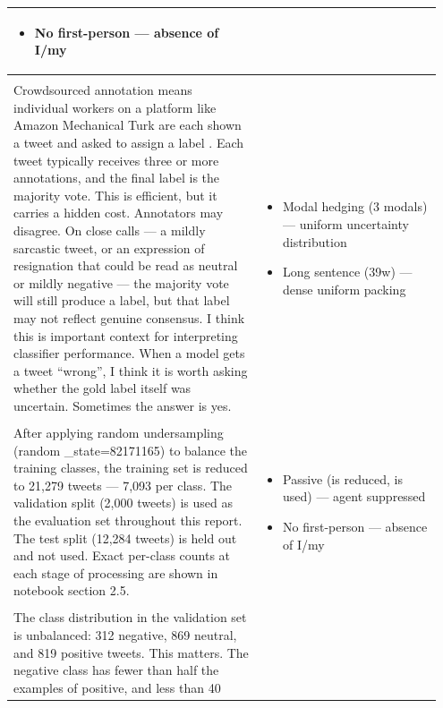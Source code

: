 \documentclass[11pt]{article}
\begin{document}
\begin{longtable}{|p{0.55\linewidth}|p{0.40\linewidth}|}
\begin{itemize}[leftmargin=1em,itemsep=1pt,topsep=1pt,parsep=0pt]
  \item No first-person --- absence of I/my
\end{itemize} \\[2pt]
\hline
\rule[-3.5cm]{0pt}{3.5cm} & \\
\hline
Crowdsourced annotation means individual workers on a platform like Amazon Mechanical Turk are each shown a tweet and asked to assign a label . Each tweet typically receives three or more annotations, and the final label is the majority vote. This is efficient, but it carries a hidden cost. Annotators may disagree. On close calls --- a mildly sarcastic tweet, or an expression of resignation that could be read as neutral or mildly negative --- the majority vote will still produce a label, but that label may not reflect genuine consensus. I think this is important context for interpreting classifier performance. When a model gets a tweet ``wrong'', I think it is worth asking whether the gold label itself was uncertain. Sometimes the answer is yes. & \begin{itemize}[leftmargin=1em,itemsep=1pt,topsep=1pt,parsep=0pt]
  \item Modal hedging (3 modals) --- uniform uncertainty distribution
  \item Long sentence (39w) --- dense uniform packing
\end{itemize} \\[2pt]
\hline
\rule[-3.5cm]{0pt}{3.5cm} & \\
\hline
After applying random undersampling (random \_state=82171165) to balance the training classes, the training set is reduced to 21,279 tweets --- 7,093 per class. The validation split (2,000 tweets) is used as the evaluation set throughout this report. The test split (12,284 tweets) is held out and not used. Exact per-class counts at each stage of processing are shown in notebook section 2.5. & \begin{itemize}[leftmargin=1em,itemsep=1pt,topsep=1pt,parsep=0pt]
  \item Passive (is reduced, is used) --- agent suppressed
  \item No first-person --- absence of I/my
\end{itemize} \\[2pt]
\hline
\rule[-3.5cm]{0pt}{3.5cm} & \\
\hline
The class distribution in the validation set is unbalanced: 312 negative, 869 neutral, and 819 positive tweets. This matters. The negative class has fewer than half the examples of positive, and less than 40 & \begin{itemize}[leftmargin=1em,itemsep=1pt,topsep=1pt,parsep=0pt]

\end{itemize}
\end{longtable}
\end{document}
